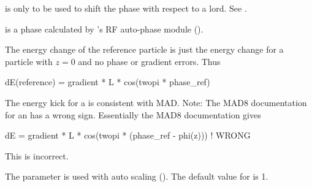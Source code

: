  is only to be used to shift the phase with respect to a
 lord. See .

 is a phase calculated by \bmad's RF auto-phase module
().

The energy change of the reference particle is just the energy change for a 
particle with $z = 0$ and no phase or gradient errors. Thus
\begin{example}
  dE(reference) = gradient * L * cos(twopi * phase_ref)
\end{example}

The energy kick for a \bmad {} is consistent with MAD. 
Note: The MAD8 documentation for an  has a wrong
sign. Essentially the MAD8 documentation gives
\begin{example}
  dE = gradient * L * cos(twopi * (phase_ref - phi(z))) ! WRONG
\end{example}
This is incorrect. 

The  parameter is used with auto scaling
(). The default value for  is 1.

